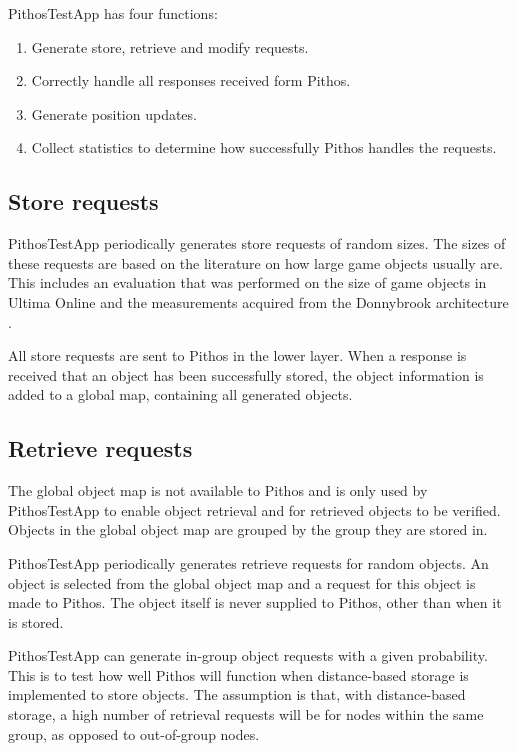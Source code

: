 PithosTestApp has four functions:
\begin{enumerate}
\item Generate store, retrieve and modify requests.
\item Correctly handle all responses received form Pithos.
\item Generate position updates.
\item Collect statistics to determine how successfully Pithos handles the requests.
\end{enumerate}

\subsection{Store requests}

PithosTestApp periodically generates store requests of random sizes. The sizes of these requests are based on the literature on how large game objects usually are. This includes an evaluation that was performed on the size of game objects in Ultima Online and the measurements acquired from the Donnybrook architecture \cite{Bharambe_Donnybrook}.

All store requests are sent to Pithos in the lower layer. When a response is received that an object has been successfully stored, the object information is added to a global map, containing all generated objects.

\subsection{Retrieve requests}

The global object map is not available to Pithos and is only used by PithosTestApp to enable object retrieval and for retrieved objects to be verified. Objects in the global object map are grouped by the group they are stored in.

PithosTestApp periodically generates retrieve requests for random objects. An object is selected from the global object map and a request for this object is made to Pithos. The object itself is never supplied to Pithos, other than when it is stored.

PithosTestApp can generate in-group object requests with a given probability. This is to test how well Pithos will function when distance-based storage is implemented to store objects. The assumption is that, with distance-based storage, a high number of retrieval requests will be for nodes within the same group, as opposed to out-of-group nodes.


